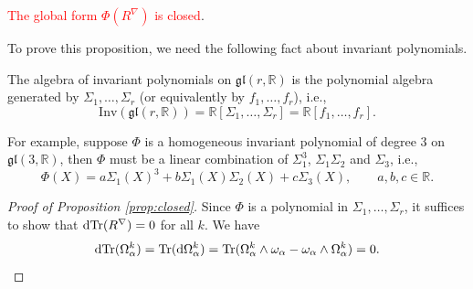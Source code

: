 \begin{proposition}\label{prop:closed}
    \textcolor{red}{The global form $\Phi(R^\nabla)$ is closed}.
\end{proposition}
To prove this proposition, we need the following fact about invariant polynomials.
\begin{fact}
    The algebra of invariant polynomials on $\mathfrak{gl}(r,\mathbb{R})$ is 
    the polynomial algebra generated by $\Sigma_1,\dots,\Sigma_r$ 
    (or equivalently by $f_1,\dots,f_r$), i.e., 
    \begin{equation*}
        \mathrm{Inv}(\mathfrak{gl}(r,\mathbb{R})) 
        = \mathbb{R}[\Sigma_1,\dots,\Sigma_r] 
        = \mathbb{R}[f_1,\dots,f_r].
    \end{equation*}
\end{fact}
For example, suppose $\Phi$ is a homogeneous invariant polynomial of degree $3$ on $\mathfrak{gl}(3,\mathbb{R})$, 
then $\Phi$ must be a linear combination of $\Sigma_1^3$, $\Sigma_1\Sigma_2$ and $\Sigma_3$, i.e.,
\begin{equation*}
    \Phi(X) = a\Sigma_1(X)^3 + b\Sigma_1(X)\Sigma_2(X) + c\Sigma_3(X), 
    \qquad a,b,c\in\mathbb{R}.
\end{equation*}

\begin{proof}[Proof of Proposition \ref{prop:closed}]
    Since $\Phi$ is a polynomial in $\Sigma_1,\dots,\Sigma_r$, 
    it suffices to show that ${\rm d}{\rm Tr}(R^\nabla)=0$ for all $k$. 
    We have 
    \begin{equation*}
        {\rm d}{\rm Tr}(\Omega_\alpha^k) = {\rm Tr}({\rm d}\Omega_\alpha^k)
        = {\rm Tr}(\Omega_\alpha^k\wedge\omega_\alpha - \omega_\alpha\wedge\Omega_\alpha^k) 
        = 0. \qedhere
    \end{equation*}
\end{proof}

